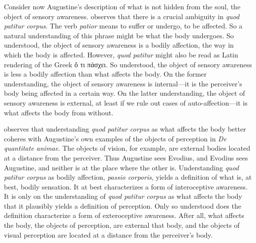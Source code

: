 \documentclass[12pt]{article}
\begin{document}
Consider now Augustine's description of what is not hidden from the soul, the object of sensory awareness. \citet[274--278]{Brittain:2002hl} observes that there is a crucial ambiguity in \emph{quod patitur corpus}. The verb \emph{patior} means to suffer or undergo, to be affected. So a natural understanding of this phrase might be what the body undergoes. So understood, the object of sensory awareness is a bodily affection, the way in which the body is affected. However, \emph{quod patitur} might also be read as Latin rendering of the Greek {\sbl ὅ τι πάσχει}. So understood, the object of sensory awareness is less a bodily affection than what affects the body. On the former understanding, the object of sensory awareness is internal---it is the perceiver's body being affected in a certain way. On the latter understanding, the object of sensory awareness is external, at least if we rule out cases of auto-affection---it is what affects the body from without. 

\citet[]{Brittain:2002hl} observes that understanding \emph{quod patitur corpus} as what affects the body better coheres with Augustine's own examples of the objects of perception in \emph{De quantitate animae}. The objects of vision, for example, are external bodies located at a distance from the perceiver. Thus Augustine sees Evodius, and Evodius sees Augustine, and neither is at the place where the other is. 
Understanding \emph{quod patitur corpus} as bodily affection, \emph{passio corporis}, yields a definition of what is, at best, bodily sensation. It at best characterizes a form of interoceptive awareness. It is only on the understanding of \emph{quod patitur corpus} as what affects the body that it plausibly yields a definition of perception. Only so understood does the definition characterize a form of exteroceptive awareness. After all, what affects the body, the objects of perception, are external that body, and the objects of visual perception are located at a distance from the perceiver's body.

\end{document}
